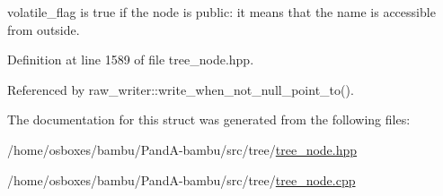 volatile\+\_\+flag is true if the node is public\+: it means that the name is accessible from outside. 



Definition at line 1589 of file tree\+\_\+node.\+hpp.



Referenced by raw\+\_\+writer\+::write\+\_\+when\+\_\+not\+\_\+null\+\_\+point\+\_\+to().



The documentation for this struct was generated from the following files\+:\begin{DoxyCompactItemize}
\item 
/home/osboxes/bambu/\+Pand\+A-\/bambu/src/tree/\hyperlink{tree__node_8hpp}{tree\+\_\+node.\+hpp}\item 
/home/osboxes/bambu/\+Pand\+A-\/bambu/src/tree/\hyperlink{tree__node_8cpp}{tree\+\_\+node.\+cpp}\end{DoxyCompactItemize}
